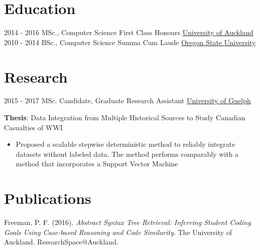\documentclass[a4paper]{twentysecondcv} %
\begin{document}
\makeprofile %

\section{Education}

\begin{twenty} %
    \twentyitem
        {2014 - 2016}
        {}
        {MSc., Computer Science \textnormal{First Class Honours}}
        {\href{http://www.uoguelph.ca/}{University of Auckland}}
        {}
        {}
    \twentyitem
        {2010 - 2014}
        {}
        {BSc., Computer Science \textnormal{Summa Cum Laude}}
        {\href{http://www.unipune.ac.in/}{Oregon State University}}
        {}
        {}
\end{twenty}

\section{Research}
\begin{twenty}
    \twentyitem
        {2015 - 2017}
        {}
        {MSc. Candidate, Graduate Research Assistant}
        {\href{http://www.uoguelph.ca/}{University of Guelph}}
        {}
        {\textbf{Thesis}: Data Integration from Multiple Historical Sources to
                          Study Canadian Casualties of WWI
        {\begin{itemize}
        \item Proposed a scalable stepwise deterministic method to reliably
              integrate datasets without labeled data. The method performs
              comparably with a method that incorporates a Support Vector
              Machine
        \end{itemize}}}
\end{twenty}

\section{Publications}
Freeman, P. F. (2016). \emph{Abstract Syntax Tree Retrieval: Inferring Student
Coding Goals Using Case-based Reasoning and Code Similarity}. The University of
Auckland. ResearchSpace@Auckland.
\end{document}
